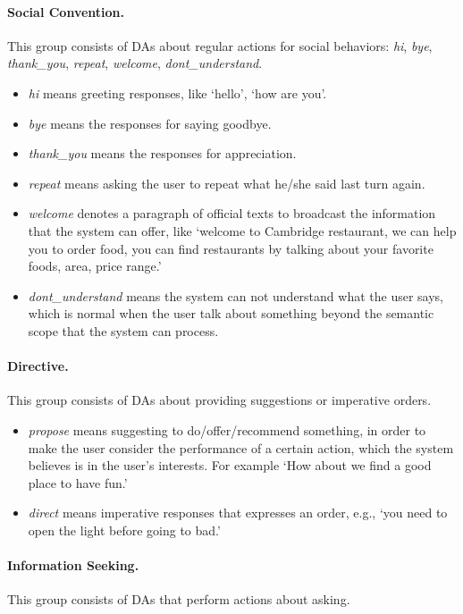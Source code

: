 \documentclass[letterpaper]{article} \usepackage{aaai22}  \usepackage{times}  \usepackage{helvet}  \usepackage{courier}  \usepackage[hyphens]{url}  \usepackage{graphicx} \urlstyle{rm} \def\UrlFont{\rm}  \usepackage{natbib}  \usepackage{caption} \DeclareCaptionStyle{ruled}{labelfont=normalfont,labelsep=colon,strut=off} \frenchspacing  \setlength{\pdfpagewidth}{8.5in}  \setlength{\pdfpageheight}{11in}  \usepackage{algorithm}
\begin{document}
\paragraph{Social Convention.} This group consists of  DAs about regular actions for social behaviors: \textit{hi}, \textit{bye}, \textit{thank\_you}, \textit{repeat}, \textit{welcome}, \textit{dont\_understand}. 
\begin{itemize}
    \item \textit{hi} means greeting responses, like `hello', `how are you'.
    \item \textit{bye} means the responses for  saying goodbye.
    \item \textit{thank\_you} means the responses for appreciation.
    \item \textit{repeat} means asking the user to repeat what he/she said last turn again.
    \item \textit{welcome} denotes a paragraph of official texts to broadcast the information that the system can offer, like `welcome to Cambridge restaurant, we can help you to order food, you can find restaurants by talking about your favorite foods, area, price range.'
    \item \textit{dont\_understand} means the system can not understand what the user says, which is normal when the user talk about something beyond the semantic scope that the system can process.
\end{itemize}


\paragraph{Directive.} This group consists of  DAs about
 providing suggestions or imperative orders.
 \begin{itemize}
    \item \textit{propose} means suggesting to do/offer/recommend something, in order to make the user consider the performance of a certain action, which the system believes is in the user's interests. For example `How about we find a good place to have fun.'
    \item \textit{direct} means imperative responses that expresses an order, e.g., `you need to open the light before going to bad.'
\end{itemize}

\paragraph{Information Seeking.} This group consists of DAs that perform actions about asking.
\end{document}
